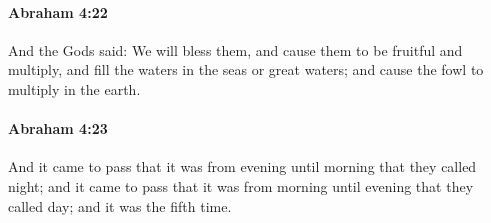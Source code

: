 
		\paragraph{Abraham 4:22} %
			\label{ABRAHAM-4-22}

			And the Gods said: We will bless them, and cause them to be fruitful and multiply, and fill the waters in the seas or great waters; and cause the fowl to multiply in the earth.


		\paragraph{Abraham 4:23} %
			\label{ABRAHAM-4-23}

			And it came to pass that it was from evening until morning that they called night; and it came to pass that it was from morning until evening that they called day; and it was the fifth time.

